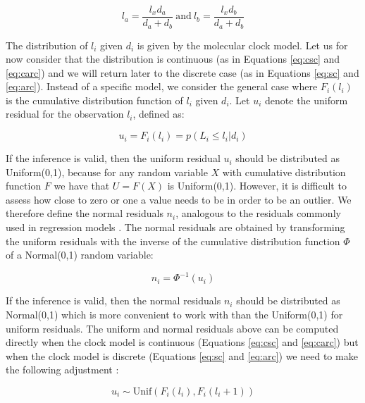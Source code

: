 \documentclass{article}
\begin{document}
\begin{equation}
l_a = \frac{l_x d_a}{d_a+d_b}\mathrm{~and~}l_b = \frac{l_x d_b}{d_a+d_b}
\end{equation}

The distribution of $l_i$ given $d_i$ is given by the molecular clock model. 
Let us for now consider that the distribution
is continuous (as in Equations \ref{eq:csc} and \ref{eq:carc}) and we will return later to the discrete case 
(as in Equations \ref{eq:sc} and \ref{eq:arc}). 
Instead of a specific model, we consider the general case where
$F_i(l_i)$ is the cumulative distribution function of $l_i$ given $d_i$.
Let $u_i$ denote the uniform residual for the observation $l_i$, defined as:

\begin{equation}
u_i=F_i(l_i)=p(L_i\leq l_i|d_i)
\label{eq:unif-resid}
\end{equation}

If the inference is valid, then the uniform residual $u_i$ 
should be distributed as Uniform(0,1), because for any random variable $X$ with cumulative distribution function $F$ we have that $U=F(X)$ is Uniform(0,1). 
However, it is difficult to assess how close to zero or one a value needs to be in order to be 
an outlier. 
We therefore define the normal residuals $n_i$, analogous to the residuals commonly used in 
regression models \citep{coxGeneralDefinitionResiduals1968,dunnRandomizedQuantileResiduals1996}. 
The normal residuals are obtained 
by transforming the uniform residuals with the inverse of the cumulative distribution function $\Phi$ 
of a Normal(0,1) random variable:

\begin{equation}
n_i=\Phi^{-1}(u_i)
\label{eq:norm-resid}
\end{equation}

If the inference is valid, then the normal residuals $n_i$ should be distributed
as Normal(0,1) which is more convenient to work with than the Uniform(0,1) for uniform residuals.
The uniform and normal residuals above can be computed directly
when the clock model is continuous (Equations \ref{eq:csc} and \ref{eq:carc}) but when
the clock model is discrete (Equations \ref{eq:sc} and \ref{eq:arc}) we need to make the following
adjustment \citep{dunnRandomizedQuantileResiduals1996,brockwellUniversalResidualsMultivariate2007,lauNewModelDiagnostics2014}:

\begin{equation}
u_i \sim \mathrm{Unif}(F_i(l_i),F_i(l_i+1))
\label{eq:unif-resid-discrete}
\end{equation}
\end{document}
